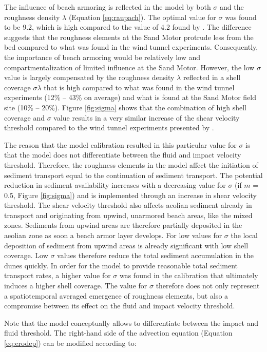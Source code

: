 The influence of beach armoring is reflected in the model by both
$\sigma$ and the roughness density $\lambda$ (Equation
\ref{eq:raupach}). The optimal value for $\sigma$ was found to be 9.2,
which is high compared to the value of 4.2 found by
\citet{McKennaNeuman2012}. The difference suggests that the roughness
elements at the Sand Motor protrude less from the bed compared to what
was found in the wind tunnel experiments. Consequently, the importance
of beach armoring would be relatively low and compartmentalization of
limited influence at the Sand Motor. However, the low $\sigma$ value
is largely compensated by the roughness density $\lambda$ reflected in
a shell coverage $\sigma \lambda$ that is high compared to what was
found in the wind tunnel experiments (12\% -- 43\% on average) and
what is found at the Sand Motor field site (10\% -- 20\%). Figure
\ref{fig:sigma} shows that the combination of high shell coverage and
$\sigma$ value results in a very similar increase of the shear
velocity threshold compared to the wind tunnel experiments presented
by \citet{McKennaNeuman2012}.

The reason that the model calibration resulted in this particular
value for $\sigma$ is that the model does not differentiate between
the fluid and impact velocity threshold.  Therefore, the roughness
elements in the model affect the initiation of sediment transport
equal to the continuation of sediment transport. The potential
reduction in sediment availability increases with a decreasing value
for $\sigma$ (if $m$ = 0.5, Figure \ref{fig:sigma}) and is implemented
through an increase in shear velocity threshold. The shear velocity
threshold also affects aeolian sediment already in transport and
originating from upwind, unarmored beach areas, like the mixed
zones. Sediments from upwind areas are therefore partially deposited
in the aeolian zone as soon a beach armor layer develops. For low
values for $\sigma$ the local deposition of sediment from upwind areas
is already significant with low shell coverage. Low $\sigma$ values
therefore reduce the total sediment accumulation in the dunes
quickly. In order for the model to provide reasonable total sediment
transport rates, a higher value for $\sigma$ was found in the
calibration that ultimately induces a higher shell coverage. The value
for $\sigma$ therefore does not only represent a spatiotemporal
averaged emergence of roughness elements, but also a compromise
between its effect on the fluid and impact velocity threshold.

Note that the model conceptually allows to differentiate between the
impact and fluid threshold. The right-hand side of the advection
equation (Equation \ref{eq:erodep}) can be modified according to:


